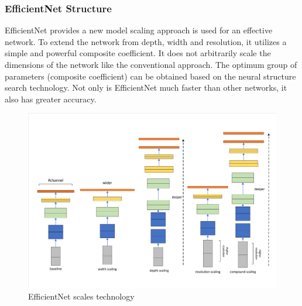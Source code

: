 \documentclass[12pt]{article}
\begin{document}
\subsubsection{EfficientNet Structure}
EfficientNet\cite{EfficientNet} provides a new model scaling approach is used for an effective network. To extend the network from depth, width and resolution, it utilizes a simple and powerful composite coefficient. It does not arbitrarily scale the dimensions of the network like the conventional approach. The optimum group of parameters (composite coefficient) can be obtained based on the neural structure search technology. Not only is EfficientNet much faster than other networks, it also has greater accuracy.

\begin{figure}[H]
	\small
	\centering
	\includegraphics[width=14cm]{./pictures/network_scale.pdf}
	\caption{EfficientNet scales technology}\label{jj}
\end{figure}
\end{document}
